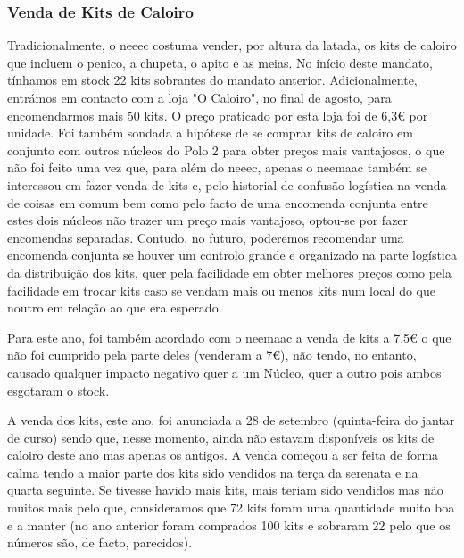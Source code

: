 
\subsubsection{Venda de Kits de Caloiro}

Tradicionalmente, o \acrshort{neeec} costuma vender, por altura da latada, os kits de caloiro que incluem o penico, a chupeta, o apito e as meias. No início deste mandato, tínhamos em stock 22 kits sobrantes do mandato anterior. Adicionalmente, entrámos em contacto com a loja "O Caloiro", no final de agosto, para encomendarmos mais 50 kits. O preço praticado por esta loja foi de 6,3€ por unidade. Foi também sondada a hipótese de se comprar kits de caloiro em conjunto com outros núcleos do Polo 2 para obter preços mais vantajosos, o que não foi feito uma vez que, para além do \acrshort{neeec}, apenas o \acrshort{neemaac} também se interessou em fazer venda de kits e, pelo historial de confusão logística na venda de coisas em comum bem como pelo facto de uma encomenda conjunta entre estes dois núcleos não trazer um preço mais vantajoso, optou-se por fazer encomendas separadas. Contudo, no futuro, poderemos recomendar uma encomenda conjunta se houver um controlo grande e organizado na parte logística da distribuição dos kits, quer pela facilidade em obter melhores preços como pela facilidade em trocar kits caso se vendam mais ou menos kits num local do que noutro em relação ao que era esperado.

Para este ano, foi também acordado com o \acrshort{neemaac} a venda de kits a 7,5€ o que não foi cumprido pela parte deles (venderam a 7€), não tendo, no entanto, causado qualquer impacto negativo quer a um Núcleo, quer a outro pois ambos esgotaram o stock.

A venda dos kits, este ano, foi anunciada a 28 de setembro (quinta-feira do jantar de curso) sendo que, nesse momento, ainda não estavam disponíveis os kits de caloiro deste ano mas apenas os antigos. A venda começou a ser feita de forma calma tendo a maior parte dos kits sido vendidos na terça da serenata e na quarta seguinte. Se tivesse havido mais kits, mais teriam sido vendidos mas não muitos mais pelo que, consideramos que 72 kits foram uma quantidade muito boa e a manter (no ano anterior foram comprados 100 kits e sobraram 22 pelo que os números são, de facto, parecidos).
